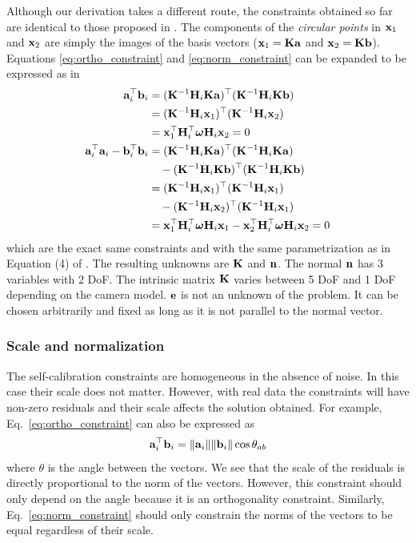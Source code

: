 \documentclass[10pt,twocolumn,letterpaper]{article}
\begin{document}
Although our derivation takes a different route, the constraints obtained so far are identical to those proposed in \cite{bocquillon2006}. The components of the \emph{circular points} in \cite{bocquillon2006} $\mathbf{x}_1$ and $\mathbf{x}_2$ are simply the images of the basis vectors (\ie $\mathbf{x}_1=\mathbf{K} \mathbf{a}$ and $\mathbf{x}_2=\mathbf{K} \mathbf{b}$). Equations \eqref{eq:ortho_constraint} and \eqref{eq:norm_constraint} can be expanded to be expressed as in \cite{bocquillon2006}
%
\begin{align}
\mathbf{a}_i^\top \mathbf{b}_i &= (\mathbf{K}^{-1} \mathbf{H}_i \mathbf{K} \mathbf{a})^\top (\mathbf{K}^{-1} \mathbf{H}_i \mathbf{K} \mathbf{b}) \notag \\
&= (\mathbf{K}^{-1} \mathbf{H}_i \mathbf{x}_1)^\top (\mathbf{K}^{-1} \mathbf{H}_i \mathbf{x}_2) \notag \\
&= \mathbf{x}_1^\top \mathbf{H}_i^\top \bm{\omega} \mathbf{H}_i \mathbf{x}_2 = 0 
\\
\mathbf{a}_i^\top \mathbf{a}_i - \mathbf{b}_i^\top \mathbf{b}_i &= (\mathbf{K}^{-1} \mathbf{H}_i \mathbf{K} \mathbf{a})^\top (\mathbf{K}^{-1} \mathbf{H}_i \mathbf{K} \mathbf{a}) \notag 
\\
&\quad - (\mathbf{K}^{-1} \mathbf{H}_i \mathbf{K} \mathbf{b})^\top (\mathbf{K}^{-1} \mathbf{H}_i \mathbf{K} \mathbf{b}) \notag 
\\
&= (\mathbf{K}^{-1} \mathbf{H}_i \mathbf{x}_1)^\top (\mathbf{K}^{-1} \mathbf{H}_i \mathbf{x}_1) \notag 
\\
&\quad - (\mathbf{K}^{-1} \mathbf{H}_i \mathbf{x}_2)^\top (\mathbf{K}^{-1} \mathbf{H}_i \mathbf{x}_1) \notag 
\\
&= \mathbf{x}_1^\top \mathbf{H}_i^\top \bm{\omega} \mathbf{H}_i \mathbf{x}_1 - \mathbf{x}_2^\top \mathbf{H}_i^\top \bm{\omega} \mathbf{H}_i \mathbf{x}_2 = 0 
\end{align}
which are the exact same constraints and with the same parametrization as in Equation (4) of \cite{bocquillon2006}. The resulting unknowns are $\mathbf{K}$ and $\mathbf{n}$. The normal $\mathbf{n}$ has 3 variables with 2 DoF. The intrinsic matrix $\mathbf{K}$ varies between 5 DoF and 1 DoF depending on the camera model. $\mathbf{e}$ is not an unknown of the problem. It can be chosen arbitrarily and fixed as long as it is not parallel to the normal vector.

\subsubsection{Scale and normalization}

The self-calibration constraints are homogeneous in the absence of noise. In this case their scale does not matter. However, with real data the constraints will have non-zero residuals and their scale affects the solution obtained. For example, Eq.~\eqref{eq:ortho_constraint} can also be expressed as
\begin{align}
\mathbf{a}_i^\top \mathbf{b}_i = \lVert\mathbf{a}_i\rVert \lVert\mathbf{b}_i\rVert \cos \theta_{a b}
\end{align} 
where $\theta$ is the angle between the vectors. We see that the scale of the residuals is directly proportional to the norm of the vectors. However, this constraint should only depend on the angle because it is an orthogonality constraint. Similarly, Eq.~\eqref{eq:norm_constraint} should only constrain the norms of the vectors to be equal regardless of their scale.
\end{document}

